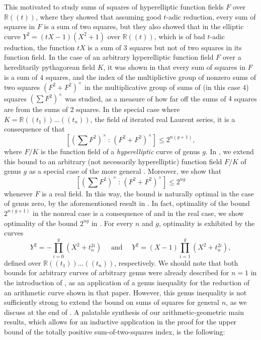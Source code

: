 \documentclass[a4paper,12pt,reqno]{amsart}
\theoremstyle{definition}
\numberwithin{equation}{thm}
\renewcommand{\leq}{\leqslant}
\begin{document}
This motivated \cite{TVY04} to study sums of squares of hyperelliptic function fields 
$F$ over $\mathbb{R}(\!(t)\!)$, where they showed that assuming good $t$-adic reduction, every sum of squares in $F$  is a sum of two squares, but they also showed that in the elliptic curve $Y^2=(tX-1)(X^2 +1)$ over $\mathbb{R}(\!(t)\!)$, which is of bad $t$-adic reduction, the function $tX$ is a sum of $3$ squares but not of two squares in its function field. 
In the case of an arbitrary hyperelliptic function field $F$ over a  hereditarily pythagorean field $K$, it was shown in \cite{BVG} that every sum of squares in $F$ is a sum of $4$ squares, and the index of the multiplictive group of nonzero sums of two squares $(F^2+F^2)^\times$ in the multiplicative group of sums of (in this case $4$) squares $\left(\sum F^2\right)^\times$ was studied, as a measure of how far off the sums of $4$ squares are from the sums of $2$ squares.
In the special case where $K=\mathbb{R}(\!(t_1)\!)\ldots (\!(t_n)\!)$, the field of iterated real Laurent series, it is a consequence of \cite[Theorem 3.10]{BVG}  that $$ \left[\left(\sum F^2\right)^\times \, : \, (F^2+F^2)^\times \right]  \leq 2^{n(g+1)},$$ where $F/K$ is the function field of a \textit{hyperelliptic} curve of genus $g$.
In , we extend this bound to an arbitrary (not necessarily hyperelliptic) function field $F/K$ of genus $g$ as a special case of the more general . Moreover, we show that $$ \left[\left(\sum F^2\right)^\times \, : \, (F^2+F^2)^\times \right] \leq 2^{ng}$$ whenever $F$ is a real field.  In this way, the bound is naturally optimal in the case of genus zero, by the aforementioned result in \cite{TY03}. In fact, optimality of the bound $2^{n(g+1)}$ in the nonreal case is 
 a consequence of \cite[Example 4.5]{GM24} and in the real case, we show optimality of the bound $2^{ng}$ in .  For every $n$ and $g$, optimality is exhibited by the curves $$Y^2=-\prod_{i=0}^{g}(X^{2}+t_{n}^{2i}) \quad \text{ and } \quad Y^2=(X-1)\prod_{i=1}^{g}(X^{2}+t_{n}^{2i}),$$
defined over $\mathbb{R}(\!(t_1)\!)\ldots (\!(t_n)\!)$, respectively.
We should note that both bounds for arbitrary curves of arbitrary genus were already described for $n=1$ in the introduction of \cite{BG24}, as an application of a genus inequality for the reduction of an arithmetic curve shown in that paper. However, this genus inequality is not sufficiently strong to extend the bound on sums of squares for general $n$, as we discuss at the end of . A palatable synthesis of our arithmetic-geometric main results, which allows for an inductive application in the proof for the upper bound of the totally positive sum-of-two-squares index, is the following:
\end{document}
